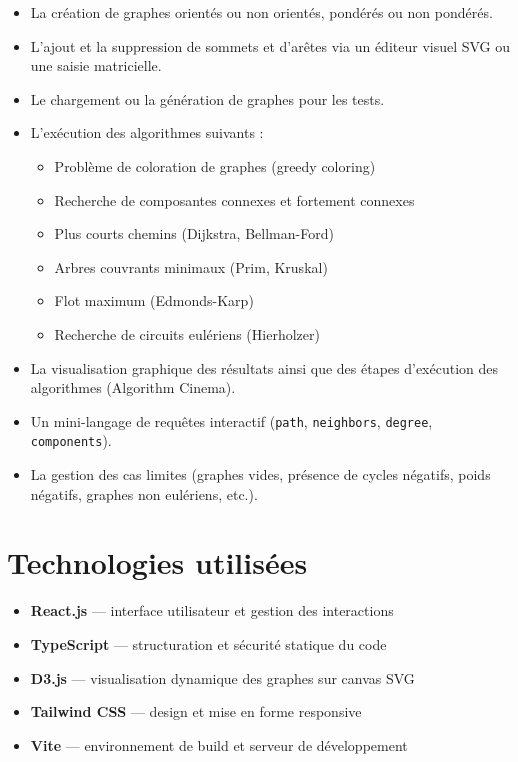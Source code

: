 \documentclass[a4paper,12pt]{report}
\begin{document}
\begin{itemize}
    \item La création de graphes orientés ou non orientés, pondérés ou non pondérés.
    \item L'ajout et la suppression de sommets et d'arêtes via un éditeur visuel SVG ou une saisie matricielle.
    \item Le chargement ou la génération de graphes pour les tests.
    \item L'exécution des algorithmes suivants :
    \begin{itemize}
        \item Problème de coloration de graphes (greedy coloring)
        \item Recherche de composantes connexes et fortement connexes
        \item Plus courts chemins (Dijkstra, Bellman-Ford)
        \item Arbres couvrants minimaux (Prim, Kruskal)
        \item Flot maximum (Edmonds-Karp)
        \item Recherche de circuits eulériens (Hierholzer)
    \end{itemize}
    \item La visualisation graphique des résultats ainsi que des étapes d'exécution des algorithmes (Algorithm Cinema).
    \item Un mini-langage de requêtes interactif (\texttt{path}, \texttt{neighbors}, \texttt{degree}, \texttt{components}).
    \item La gestion des cas limites (graphes vides, présence de cycles négatifs, poids négatifs, graphes non eulériens, etc.).
\end{itemize}

\section{Technologies utilisées}

\begin{itemize}
    \item \textbf{React.js} — interface utilisateur et gestion des interactions
    \item \textbf{TypeScript} — structuration et sécurité statique du code
    \item \textbf{D3.js} — visualisation dynamique des graphes sur canvas SVG
    \item \textbf{Tailwind CSS} — design et mise en forme responsive
    \item \textbf{Vite} — environnement de build et serveur de développement
\end{itemize}
\end{document}
